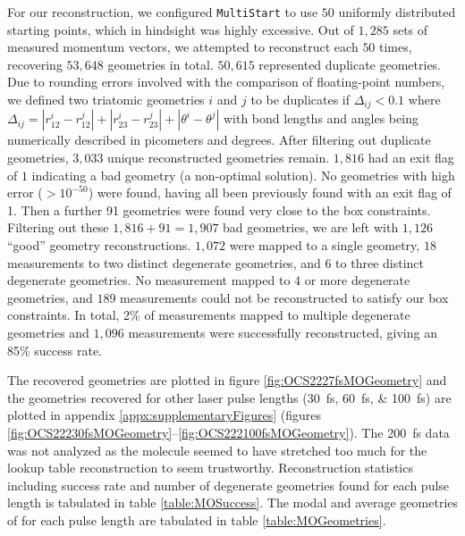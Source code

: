 For our reconstruction, we configured \texttt{MultiStart} to use $50$ uniformly distributed starting points, which in hindsight was highly excessive. Out of $1,285$ sets of measured momentum vectors, we attempted to reconstruct each $50$ times, recovering $53,648$ geometries in total. $50,615$ represented duplicate geometries. Due to rounding errors involved with the comparison of floating-point numbers, we defined two triatomic geometries $i$ and $j$ to be duplicates if $\Delta_{ij} < 0.1$ where $\Delta_{ij} = |r_{12}^i - r_{12}^j| + |r_{23}^i - r_{23}^j| + |\theta^i - \theta^j|$ with bond lengths and angles being numerically described in picometers and degrees. After filtering out duplicate geometries, $3,033$ unique reconstructed geometries remain. $1,816$ had an exit flag of $1$ indicating a bad geometry (a non-optimal solution). No geometries with high error ($>10^{-50}$) were found, having all been previously found with an exit flag of 1. Then a further 91 geometries were found very close to the box constraints. Filtering out these $1,816 + 91 = 1,907$ bad geometries, we are left with $1,126$ ``good'' geometry reconstructions. $1,072$ were mapped to a single geometry, $18$ measurements to two distinct degenerate geometries, and $6$ to three distinct degenerate geometries. No measurement mapped to $4$ or more degenerate geometries, and $189$ measurements could not be reconstructed to satisfy our box constraints. In total, 2\% of measurements mapped to multiple degenerate geometries and $1,096$ measurements were successfully reconstructed, giving an 85\% success rate.

The recovered geometries are plotted in figure \ref{fig:OCS2227fsMOGeometry} and the geometries recovered for other laser pulse lengths (\SIlist{30;60;100}{\femto\s}) are plotted in appendix \ref{appx:supplementaryFigures} (figures \ref{fig:OCS22230fsMOGeometry}--\ref{fig:OCS222100fsMOGeometry}). The \SI{200}{\femto\s} data was not analyzed as the molecule seemed to have stretched too much for the lookup table reconstruction to seem trustworthy. Reconstruction statistics including success rate and number of degenerate geometries found for each pulse length is tabulated in table \ref{table:MOSuccess}. The modal and average geometries of for each pulse length are tabulated in table \ref{table:MOGeometries}.


